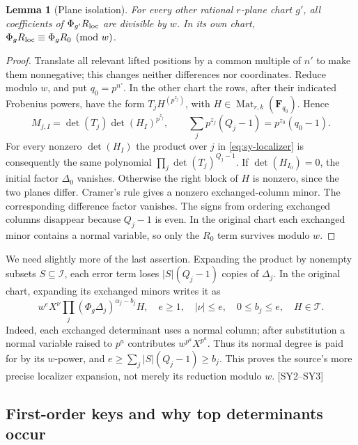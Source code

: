 \documentclass[11pt,a4paper]{article}
\numberwithin{equation}{section}
\newtheorem{lemma}[theorem]{Lemma}
\theoremstyle{remark}\newtheorem{remark}[theorem]{Remark}
\begin{document}
\begin{lemma}[Plane isolation]\label{lem:sy-isolation}
For every other rational $r$-plane chart $g'$, all coefficients of $\Phi_{g'}R_{\rm loc}$ are divisible by $w$. In its own chart, $\Phi_gR_{\rm loc}\equiv\Phi_gR_0\pmod w$.
\end{lemma}
\begin{proof}
Translate all relevant lifted positions by a common multiple of $n'$ to make them nonnegative; this changes neither differences nor coordinates. Reduce modulo $w$, and put $q_0=p^{n'}$. In the other chart the rows, after their indicated Frobenius powers, have the form $T_jH^{(p^{z_j})}$, with $H\in\operatorname{Mat}_{r,k}(\mathbf F_{q_0})$. Hence
\[
M_{j,I}=\det(T_j)\det(H_I)^{p^{z_j}},\qquad
\sum_j p^{z_j}(Q_j-1)=p^{z_0}(q_0-1).
\]
For every nonzero $\det(H_I)$ the product over $j$ in \eqref{eq:sy-localizer} is consequently the same polynomial $\prod_j\det(T_j)^{Q_j-1}$. If $\det(H_{I_0})=0$, the initial factor $\Delta_0$ vanishes. Otherwise the right block of $H$ is nonzero, since the two planes differ. Cramer's rule gives a nonzero exchanged-column minor. The corresponding difference factor vanishes. The signs from ordering exchanged columns disappear because $Q_j-1$ is even. In the original chart each exchanged minor contains a normal variable, so only the $R_0$ term survives modulo $w$.
\end{proof}

We need slightly more of the last assertion. Expanding the product by nonempty subsets $S\subseteq\mathcal I$, each error term loses $|S|(Q_j-1)$ copies of $\Delta_j$. In the original chart, expanding its exchanged minors writes it as
\begin{equation}\label{eq:sy-local-error}
w^e X^{\nu}\prod_j(\Phi_g\Delta_j)^{\alpha_j-b_j}H,
\quad e\ge1,\quad |\nu|\le e,\quad 0\le b_j\le e,\quad H\in\mathcal T.
\end{equation}
Indeed, each exchanged determinant uses a normal column; after substitution a normal variable raised to $p^a$ contributes $w^{p^a}X^{p^a}$. Thus its normal degree is paid for by its $w$-power, and $e\ge\sum_j|S|(Q_j-1)\ge b_j$. This proves the source's more precise localizer expansion, not merely its reduction modulo $w$. \textsf{[SY2--SY3]}

\subsection{First-order keys and why top determinants occur}
\end{document}
